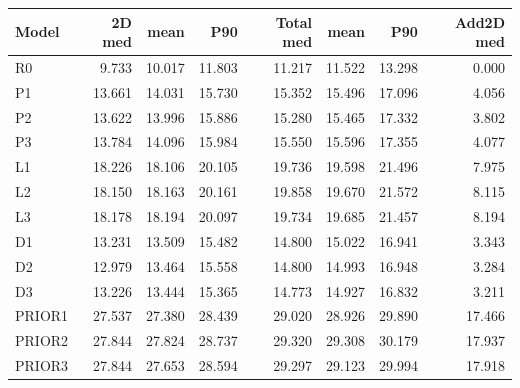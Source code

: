 \begin{longtable}{lrrrrrrr}\toprule Model & 2D med & mean & P90 & Total med & mean & P90 & Add2D med\\\midrule\endhead
R0 & 9.733 & 10.017 & 11.803 & 11.217 & 11.522 & 13.298 & 0.000 \\
P1 & 13.661 & 14.031 & 15.730 & 15.352 & 15.496 & 17.096 & 4.056 \\
P2 & 13.622 & 13.996 & 15.886 & 15.280 & 15.465 & 17.332 & 3.802 \\
P3 & 13.784 & 14.096 & 15.984 & 15.550 & 15.596 & 17.355 & 4.077 \\
L1 & 18.226 & 18.106 & 20.105 & 19.736 & 19.598 & 21.496 & 7.975 \\
L2 & 18.150 & 18.163 & 20.161 & 19.858 & 19.670 & 21.572 & 8.115 \\
L3 & 18.178 & 18.194 & 20.097 & 19.734 & 19.685 & 21.457 & 8.194 \\
D1 & 13.231 & 13.509 & 15.482 & 14.800 & 15.022 & 16.941 & 3.343 \\
D2 & 12.979 & 13.464 & 15.558 & 14.800 & 14.993 & 16.948 & 3.284 \\
D3 & 13.226 & 13.444 & 15.365 & 14.773 & 14.927 & 16.832 & 3.211 \\
PRIOR1 & 27.537 & 27.380 & 28.439 & 29.020 & 28.926 & 29.890 & 17.466 \\
PRIOR2 & 27.844 & 27.824 & 28.737 & 29.320 & 29.308 & 30.179 & 17.937 \\
PRIOR3 & 27.844 & 27.653 & 28.594 & 29.297 & 29.123 & 29.994 & 17.918 \\
\bottomrule\end{longtable}
